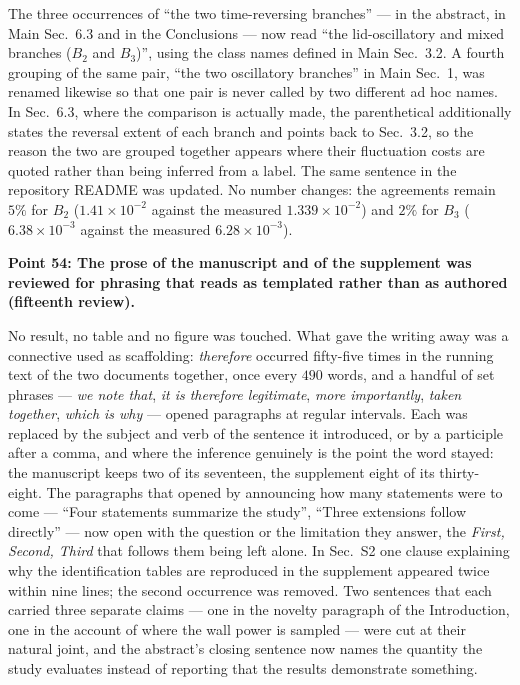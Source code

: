 \documentclass[11pt,a4paper]{article}
\begin{document}
The three occurrences of ``the two time-reversing branches'' --- in the abstract, in
Main Sec.~6.3 and in the Conclusions --- now read ``the lid-oscillatory and mixed
branches (\(B_2\) and \(B_3\))'', using the class names defined in Main Sec.~3.2. A
fourth grouping of the same pair, ``the two oscillatory branches'' in Main Sec.~1, was
renamed likewise so that one pair is never called by two different ad hoc names. In
Sec.~6.3, where the comparison is actually made, the parenthetical additionally states
the reversal extent of each branch and points back to Sec.~3.2, so the reason the two
are grouped together appears where their fluctuation costs are quoted rather than being
inferred from a label. The same sentence in the repository README was updated. No
number changes: the agreements remain \(5\%\) for \(B_2\)
(\(1.41\times10^{-2}\) against the measured \(1.339\times10^{-2}\)) and \(2\%\) for
\(B_3\) (\(6.38\times10^{-3}\) against the measured \(6.28\times10^{-3}\)).

\vspace{1em}

\noindent\textbf{Point 54: The prose of the manuscript and of the supplement was
reviewed for phrasing that reads as templated rather than as authored (fifteenth
review).}

No result, no table and no figure was touched. What gave the writing away was a
connective used as scaffolding: \emph{therefore} occurred fifty-five times in the
running text of the two documents together, once every \(490\) words, and a handful of
set phrases --- \emph{we note that}, \emph{it is therefore legitimate}, \emph{more
importantly}, \emph{taken together}, \emph{which is why} --- opened paragraphs at
regular intervals. Each was replaced by the subject and verb of the sentence it
introduced, or by a participle after a comma, and where the inference genuinely is the
point the word stayed: the manuscript keeps two of its seventeen, the supplement eight
of its thirty-eight. The paragraphs that opened by announcing how many statements were
to come --- ``Four statements summarize the study'', ``Three extensions follow
directly'' --- now open with the question or the limitation they answer, the
\emph{First, Second, Third} that follows them being left alone. In Sec.~S2 one clause
explaining why the identification tables are reproduced in the supplement appeared
twice within nine lines; the second occurrence was removed. Two sentences that each
carried three separate claims --- one in the novelty paragraph of the Introduction, one
in the account of where the wall power is sampled --- were cut at their natural joint,
and the abstract's closing sentence now names the quantity the study evaluates instead
of reporting that the results demonstrate something.
\end{document}
